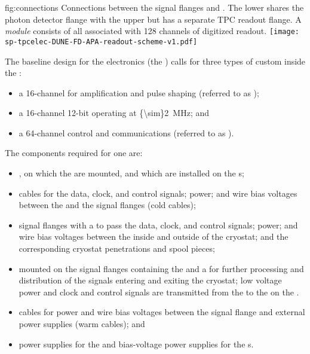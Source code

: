 \begin{dunefigure}
{fig:connections}
{Connections between the signal flanges and . The lower 
 shares the photon detector flange with the 
upper  but has a separate TPC readout flange. 
A \textit{ module} consists of all  
associated with \num{128} channels of digitized readout.}
\texttt{[image: sp-tpcelec-DUNE-FD-APA-readout-scheme-v1.pdf]}
\end{dunefigure}

The baseline design for the   electronics (the ) calls for three 
types of custom  inside  the :
\begin{itemize}
\item{a \num{16}-channel   for amplification 
and pulse shaping (referred to as );}
\item{a \num{16}-channel \num{12}-bit   
operating at \SI{{\sim}2}{MHz}; and}
\item{a \num{64}-channel control and communications  
(referred to as ).}
\end{itemize}

The  components %
required for one  are: 
\begin{itemize}
\item{, on which the  are mounted, and 
which are installed on the s;}
\item{cables for the data, clock, and control signals;  
power; and wire bias voltages between the  and the 
signal flanges (cold cables);}
\item{signal flanges with a  \fdth to pass the data, clock, 
and control signals;  power; and  wire bias 
voltages between the inside and outside of the cryostat; and 
the corresponding cryostat penetrations and spool pieces;}
\item{ mounted on the signal flanges 
containing the  and a  for further processing
and distribution of the signals entering and exiting the cryostat;
low voltage power and clock and control signals are transmitted
from the  to the  on 
the .}
\item{cables for  power and wire bias voltages between 
the signal flange and external power supplies (warm cables); and}
\item{ power supplies for the  and bias-voltage 
power supplies for the s.}
\end{itemize}

